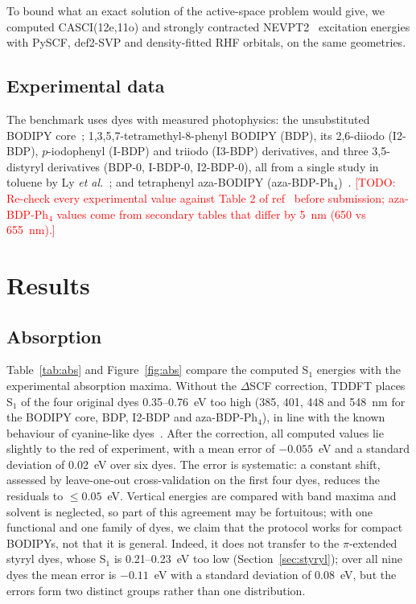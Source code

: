 \documentclass[journal=jpcafh,manuscript=article]{achemso}
\newcommand{\todo}[1]{\textcolor{red}{[TODO: #1]}}
\begin{document}
To bound what an exact solution of the active-space problem would give, we computed CASCI(12e,11o)
and strongly contracted NEVPT2~\cite{Angeli2001} excitation energies with PySCF, def2-SVP and
density-fitted RHF orbitals, on the same geometries.

\subsection{Experimental data}

The benchmark uses dyes with measured photophysics: the unsubstituted BODIPY core~\cite{Schmitt2009};
1,3,5,7-tetramethyl-8-phenyl BODIPY (BDP), its 2,6-diiodo (I2-BDP), $p$-iodophenyl (I-BDP) and
triiodo (I3-BDP) derivatives, and three 3,5-distyryl derivatives (BDP-0, I-BDP-0, I2-BDP-0), all from
a single study in toluene by Ly \emph{et al.}~\cite{Ly2021}; and tetraphenyl aza-BODIPY
(aza-BDP-Ph$_4$)~\cite{Killoran2002,Gorman2004,Loudet2008}. \todo{Re-check every experimental value
against Table 2 of ref~\citenum{Ly2021} before submission; aza-BDP-Ph$_4$ values come from secondary
tables that differ by 5~nm (650 vs 655~nm).}

\section{Results}

\subsection{Absorption}

Table~\ref{tab:abs} and Figure~\ref{fig:abs} compare the computed S$_1$ energies with the
experimental absorption maxima. Without the $\Delta$SCF correction, TDDFT places S$_1$ of the four
original dyes 0.35--0.76~eV too high (385, 401, 448 and 548~nm for the BODIPY core, BDP, I2-BDP and
aza-BDP-Ph$_4$), in line with the known behaviour of cyanine-like dyes~\cite{Momeni2015}. After the
correction, all computed values lie slightly to the red of experiment, with a mean error of
$-0.055$~eV and a standard deviation of 0.02~eV over six dyes. The error is systematic: a constant
shift, assessed by leave-one-out cross-validation on the first four dyes, reduces the residuals to
$\le0.05$~eV. Vertical energies are compared with band maxima and solvent is neglected, so part of
this agreement may be fortuitous; with one functional and one family of dyes, we claim that the
protocol works for compact BODIPYs, not that it is general. Indeed, it does not transfer to the
$\pi$-extended styryl dyes, whose S$_1$ is 0.21--0.23~eV too low (Section~\ref{sec:styryl}); over
all nine dyes the mean error is $-0.11$~eV with a standard deviation of 0.08~eV, but the errors
form two distinct groups rather than one distribution.
\end{document}
